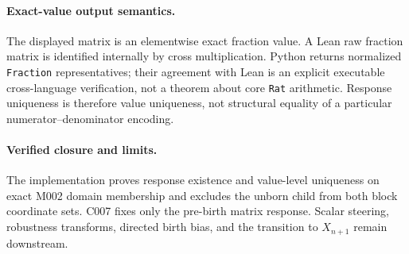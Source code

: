 \paragraph*{Exact-value output semantics.}
The displayed matrix is an elementwise exact fraction value. A Lean raw fraction matrix is identified internally by cross multiplication. Python returns normalized \texttt{Fraction} representatives; their agreement with Lean is an explicit executable cross-language verification, not a theorem about core \texttt{Rat} arithmetic.  Response uniqueness is therefore value uniqueness, not structural equality of a particular numerator--denominator encoding.

\paragraph*{Verified closure and limits.}
The implementation proves response existence and value-level uniqueness on
exact M002 domain membership and excludes the unborn child from both block
coordinate sets.  C007 fixes only the pre-birth matrix response.  Scalar
steering, robustness transforms, directed birth bias, and the transition to
$X_{n+1}$ remain downstream.
